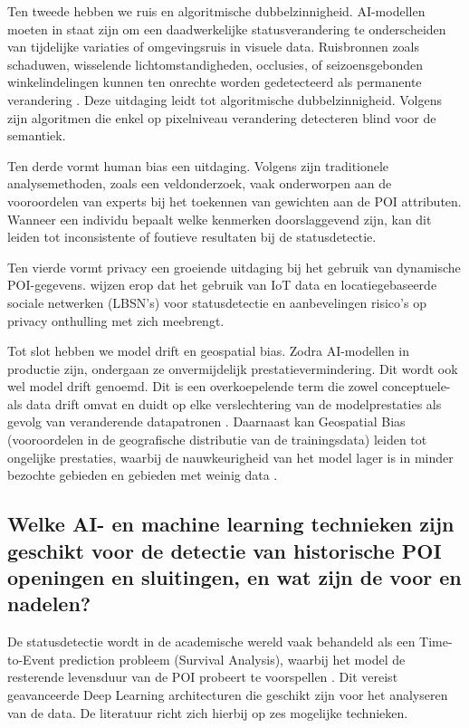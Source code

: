 Ten tweede hebben we ruis en algoritmische dubbelzinnigheid. AI-modellen moeten in staat zijn om een daadwerkelijke statusverandering te onderscheiden van tijdelijke variaties of omgevingsruis in visuele data. Ruisbronnen zoals schaduwen, wisselende lichtomstandigheden, occlusies, of seizoensgebonden winkelindelingen kunnen ten onrechte worden gedetecteerd als permanente verandering \autocite{Revaud2019}. Deze uitdaging leidt tot algoritmische dubbelzinnigheid. Volgens \textcite{Revaud2019} zijn algoritmen die enkel op pixelniveau verandering detecteren blind voor de semantiek.

Ten derde vormt human bias een uitdaging. Volgens \textcite{Luo2023} zijn traditionele analysemethoden, zoals een veldonderzoek, vaak onderworpen aan de vooroordelen van experts bij het toekennen van gewichten aan de POI attributen. Wanneer een individu bepaalt welke kenmerken doorslaggevend zijn, kan dit leiden tot inconsistente of foutieve resultaten bij de statusdetectie. 

Ten vierde vormt privacy een groeiende uitdaging bij het gebruik van dynamische POI-gegevens. \textcite{Zhang2021} wijzen erop dat het gebruik van IoT data en locatiegebaseerde sociale netwerken (LBSN's) voor statusdetectie en aanbevelingen risico's op privacy onthulling met zich meebrengt.

Tot slot hebben we model drift en geospatial bias. Zodra AI-modellen in productie zijn, ondergaan ze onvermijdelijk prestatievermindering. Dit wordt ook wel model drift genoemd. Dit is een overkoepelende term die zowel conceptuele- als data drift omvat en duidt op elke verslechtering van de modelprestaties als gevolg van veranderende datapatronen \autocite{Iyer2025}. Daarnaast kan Geospatial Bias (vooroordelen in de geografische distributie van de trainingsdata) leiden tot ongelijke prestaties, waarbij de nauwkeurigheid van het model lager is in minder bezochte gebieden en gebieden met weinig data \autocite{Raza2025}.

\subsection{Welke AI- en machine learning technieken zijn geschikt voor de detectie van historische POI openingen en sluitingen, en wat zijn de voor en nadelen?}

De statusdetectie wordt in de academische wereld vaak behandeld als een Time-to-Event prediction probleem (Survival Analysis), waarbij het model de resterende levensduur van de POI probeert te voorspellen \autocite{Chen2024}. Dit vereist geavanceerde Deep Learning architecturen die geschikt zijn voor het analyseren van de data. De literatuur richt zich hierbij op zes mogelijke technieken.

